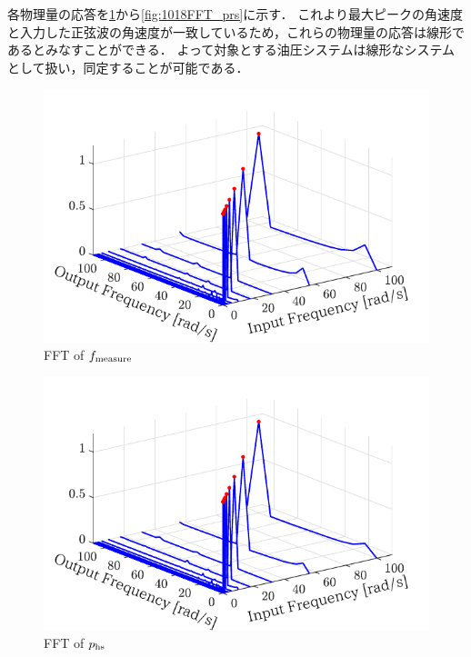 各物理量の応答を\figname\ref{fig:1018FFT_fmeasure}から\figname\ref{fig:1018FFT_prs}に示す．
これより最大ピークの角速度と入力した正弦波の角速度が一致しているため，これらの物理量の応答は線形であるとみなすことができる．
よって対象とする油圧システムは線形なシステムとして扱い，同定することが可能である．
\begin{figure}[t]
    \centering
        \includegraphics[keepaspectratio, scale=1.0]{contents/システム同定/figure/1018FFT_fmeasure.pdf}
        \caption{FFT of $f_\mathrm{measure}$}
        \label{fig:1018FFT_fmeasure}
\end{figure}
\begin{figure}[t]
    \centering
        \includegraphics[keepaspectratio, scale=1.0]{contents/システム同定/figure/1018FFT_phs.pdf}
        \caption{FFT of $p_\mathrm{hs}$}
        \label{fig:1018FFT_phs}
\end{figure}
